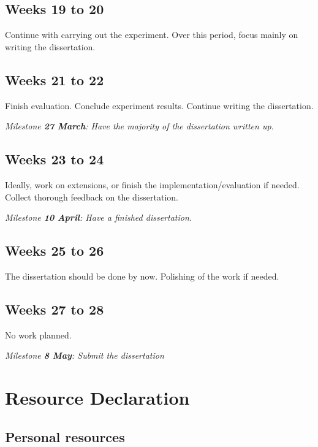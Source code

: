 \documentclass[12pt,a4paper,twoside]{article}
\begin{document}
	\subsection*{Weeks 19 to 20}
	
		Continue with carrying out the experiment. Over this period, focus mainly on writing the dissertation.
		
	
	\subsection*{Weeks 21 to 22}
	
		Finish evaluation. Conclude experiment results. Continue writing the dissertation.
		
		\textit{Milestone \textbf{27 March}: Have the majority of the dissertation written up.}
	
	\subsection*{Weeks 23 to 24}
	
	    Ideally, work on extensions, or finish the implementation/evaluation if needed. Collect thorough feedback on the dissertation.
		
		\textit{Milestone \textbf{10 April}: Have a finished dissertation.}
	
	\subsection*{Weeks 25 to 26}
		
		The dissertation should be done by now. Polishing of the work if needed.
		
		
	\subsection*{Weeks 27 to 28}
	
	    No work planned.
	    
	    \textit{Milestone \textbf{8 May}: Submit the dissertation}

\section*{Resource Declaration} \label{resourceDeclaration}

    \subsection*{Personal resources}
\end{document}
